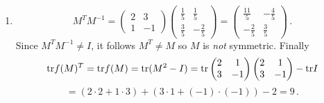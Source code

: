 \begin{enumerate}
\item
\[
M^T M^{-1}=
\begin{pmatrix}2&3\\1&-1\end{pmatrix}\begin{pmatrix}\frac15&\frac15\\[1mm]\frac35&-\frac25\end{pmatrix}
=\begin{pmatrix}\frac{11}5&-\frac45\\-\frac25&\frac35\end{pmatrix}\, .
\]
Since $M^TM^{-1}\neq I$, it follows $M^T\neq M$ so $M$ is {\itshape not} symmetric.
Finally
\[
{\rm tr} f(M)^T= {\rm tr} f(M) = {\rm tr}(M^2-I)={\rm tr}\begin{pmatrix}2&1\\3&-1\end{pmatrix}\begin{pmatrix}2&1\\3&-1\end{pmatrix}-{\rm tr} I
\]
\[
=(2\cdot 2+1\cdot 3)+(3\cdot 1+(-1)\cdot(-1))-2=9\, .
\]


\end{enumerate}
